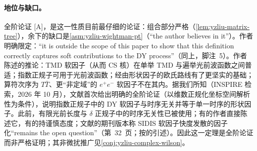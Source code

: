 \paragraph{地位与缺口。}全阶论证 [A]，是这一性质目前最仔细的论证：组合部分严格（\cref{lem:yzliu-matrix-tree}），余下的缺口是\cref{asm:yzliu-wightman-pt}（“the author believes in it”\cite[第~4~节]{Liu:2023pjb}）。作者明确限定：“it is outside the scope of this paper to show that this definition correctly captures soft contributions to the DY process”（同上，脚注~5）。作者陈述的推论：TMD 软因子（从而 CS 核）在单举 TMD 与遍举光前波函数之间普适；指数正规子可用于光前波函数；经由形状因子的欧氏路线有了更坚实的基础；算符次序为 $T\bar T$、更“非定域”的 $e^+e^-$ 软因子不在其内。据我们所知（INSPIRE 检索，2026 年 10 月），文献\cite{Liu:2023pjb}首次给出明确的全阶论证（以维数正规化坐标空间解析性为条件），说明指数正规子中的 DY 软因子与时序无关并等于单一时序的形状因子。此前，有限光前长度与 $\delta$ 正规子中的时序无关性已被使用\cite{Vladimirov:2016dll,Vladimirov:2017ksc}；有的作者直接陈述它\cite{Collins2011,CollinsMetz2004,Echevarria:2015byo}，有的持谨慎态度\cite{Moult:2018jzp}；文献\cite{Vladimirov:2017ksc}的期刊版本称 SIDIS 软因子快度发散的因子化“remains the open question”（第~32~页；按\cite{Liu:2023pjb}的引述）。因此这一定理是全阶论证而非严格证明；其非微扰推广见\cref{conj:yzliu-complex-wilson}。

